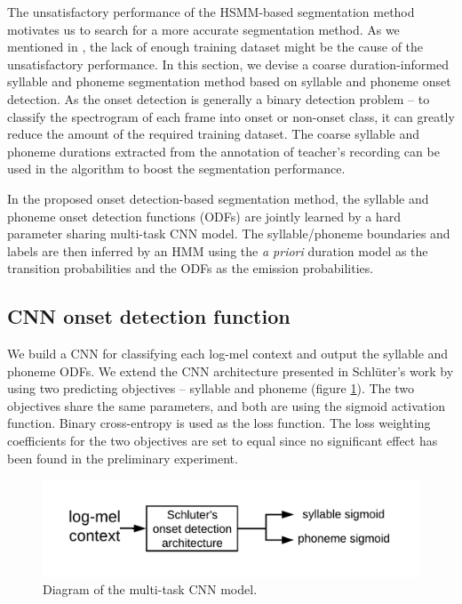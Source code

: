 The unsatisfactory performance of the HSMM-based segmentation method motivates us to search for a more accurate segmentation method. As we mentioned in , the lack of enough training dataset might be the cause of the unsatisfactory performance. In this section, we devise a coarse duration-informed syllable and phoneme segmentation method based on syllable and phoneme onset detection. As the onset detection is generally a binary detection problem -- to classify the spectrogram of each frame into onset or non-onset class, it can greatly reduce the amount of the required training dataset. The coarse syllable and phoneme durations extracted from the annotation of teacher's recording can be used in the algorithm to boost the segmentation performance.

In the proposed onset detection-based segmentation method, the syllable and phoneme onset detection functions (ODFs) are jointly learned by a hard parameter sharing multi-task CNN model. The syllable/phoneme boundaries and labels are then inferred by an HMM using the \textit{a priori} duration model as the transition probabilities and the ODFs as the emission probabilities.

\subsection{CNN onset detection function}\label{sec:ch5:cnn_odf}

We build a CNN for classifying each log-mel context and output the syllable and phoneme ODFs. We extend the CNN architecture presented in Schl\"{u}ter's work \cite{Schluter2014} by using two predicting objectives -- syllable and phoneme (figure \ref{fig:cnn_architecture}). The two objectives share the same parameters, and both are using the sigmoid activation function. Binary cross-entropy is used as the loss function. The loss weighting coefficients for the two objectives are set to equal since no significant effect has been found in the preliminary experiment.

\begin{figure}[ht!]
    \centering
    \includegraphics[width=\textwidth]{figs/blockDiags_rong/ch5_cnn_architecture_segmentation.png}
    \caption{Diagram of the multi-task CNN model.}
    \label{fig:cnn_architecture}
\end{figure}

